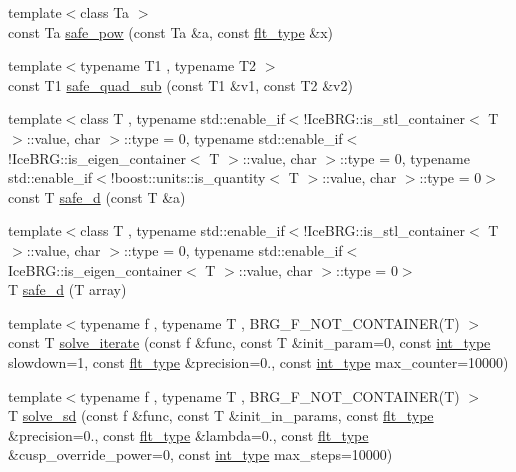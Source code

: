 \begin{DoxyCompactItemize}
\item 
{\footnotesize template$<$class Ta $>$ }\\const Ta \hyperlink{namespaceIceBRG_ae960572dedc59ab5314b423617082dbd}{safe\-\_\-pow} (const Ta \&a, const \hyperlink{lib_2IceBRG__main_2common_8h_ad0f130a56eeb944d9ef2692ee881ecc4}{flt\-\_\-type} \&x)
\item 
{\footnotesize template$<$typename T1 , typename T2 $>$ }\\const T1 \hyperlink{namespaceIceBRG_abe9f946b5055d9c54a76fa82371bc8e4}{safe\-\_\-quad\-\_\-sub} (const T1 \&v1, const T2 \&v2)
\item 
{\footnotesize template$<$class T , typename std\-::enable\-\_\-if$<$!\-Ice\-B\-R\-G\-::is\-\_\-stl\-\_\-container$<$ T $>$\-::value, char $>$\-::type  = 0, typename std\-::enable\-\_\-if$<$!\-Ice\-B\-R\-G\-::is\-\_\-eigen\-\_\-container$<$ T $>$\-::value, char $>$\-::type  = 0, typename std\-::enable\-\_\-if$<$!boost\-::units\-::is\-\_\-quantity$<$ T $>$\-::value, char $>$\-::type  = 0$>$ }\\const T \hyperlink{namespaceIceBRG_a01edeedeadd173dccf4cc4a82f49ebfd}{safe\-\_\-d} (const T \&a)
\item 
{\footnotesize template$<$class T , typename std\-::enable\-\_\-if$<$!\-Ice\-B\-R\-G\-::is\-\_\-stl\-\_\-container$<$ T $>$\-::value, char $>$\-::type  = 0, typename std\-::enable\-\_\-if$<$ Ice\-B\-R\-G\-::is\-\_\-eigen\-\_\-container$<$ T $>$\-::value, char $>$\-::type  = 0$>$ }\\T \hyperlink{namespaceIceBRG_aa9da8e44096a08c6f97c598ffe1e1713}{safe\-\_\-d} (T array)
\item 
{\footnotesize template$<$typename f , typename T , B\-R\-G\-\_\-\-F\-\_\-\-N\-O\-T\-\_\-\-C\-O\-N\-T\-A\-I\-N\-E\-R(\-T) $>$ }\\const T \hyperlink{namespaceIceBRG_aba08cc0e1042eef39f76f91fb7342a7b}{solve\-\_\-iterate} (const f \&func, const T \&init\-\_\-param=0, const \hyperlink{lib_2IceBRG__main_2common_8h_ac4de9d9335536ac22821171deec8d39e}{int\-\_\-type} slowdown=1, const \hyperlink{lib_2IceBRG__main_2common_8h_ad0f130a56eeb944d9ef2692ee881ecc4}{flt\-\_\-type} \&precision=0., const \hyperlink{lib_2IceBRG__main_2common_8h_ac4de9d9335536ac22821171deec8d39e}{int\-\_\-type} max\-\_\-counter=10000)
\item 
{\footnotesize template$<$typename f , typename T , B\-R\-G\-\_\-\-F\-\_\-\-N\-O\-T\-\_\-\-C\-O\-N\-T\-A\-I\-N\-E\-R(\-T) $>$ }\\T \hyperlink{namespaceIceBRG_a6004428eeca5db8cfd9c372d359059e9}{solve\-\_\-sd} (const f \&func, const T \&init\-\_\-in\-\_\-params, const \hyperlink{lib_2IceBRG__main_2common_8h_ad0f130a56eeb944d9ef2692ee881ecc4}{flt\-\_\-type} \&precision=0., const \hyperlink{lib_2IceBRG__main_2common_8h_ad0f130a56eeb944d9ef2692ee881ecc4}{flt\-\_\-type} \&lambda=0., const \hyperlink{lib_2IceBRG__main_2common_8h_ad0f130a56eeb944d9ef2692ee881ecc4}{flt\-\_\-type} \&cusp\-\_\-override\-\_\-power=0, const \hyperlink{lib_2IceBRG__main_2common_8h_ac4de9d9335536ac22821171deec8d39e}{int\-\_\-type} max\-\_\-steps=10000)

\end{DoxyCompactItemize}
